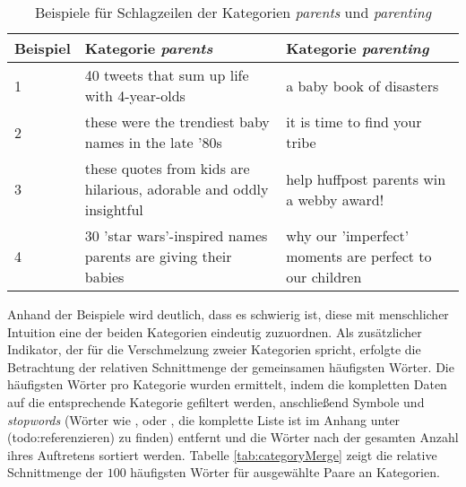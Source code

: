 \documentclass[a4paper,11pt]{article}
\begin{document}
\begin{table}[ht]
\begin{center}
\begin{tabular}{ | p{} | p{}| p{} | }
  \hline
Beispiel & Kategorie \textit{parents}  & Kategorie \textit{parenting} \\ 
  \hline
1 & 40 tweets that sum up life with 4-year-olds & a baby book of disasters \\ 
  2 & these were the trendiest baby names in the late '80s & it is time to find your tribe \\ 
  3 & these quotes from kids are hilarious, adorable and oddly insightful & help huffpost parents win a webby award! \\ 
  4 & 30  'star wars'-inspired names parents are giving their babies & why our 'imperfect' moments are perfect to our children \\ 
   \hline
\end{tabular}
\caption{Beispiele für Schlagzeilen der Kategorien \textit{parents} und \textit{parenting}}
\label{tab:parentsMerge}
\end{center}
\end{table}

Anhand der Beispiele wird deutlich, dass es schwierig ist, diese mit menschlicher Intuition eine der beiden Kategorien eindeutig zuzuordnen. Als zusätzlicher Indikator, der für die Verschmelzung zweier Kategorien spricht, erfolgte die Betrachtung der relativen Schnittmenge der gemeinsamen häufigsten Wörter. Die häufigsten Wörter pro Kategorie wurden ermittelt, indem die kompletten Daten auf die entsprechende Kategorie gefiltert werden, anschließend Symbole und \textit{stopwords} (Wörter wie ,  oder , die komplette Liste ist im Anhang unter (todo:referenzieren) zu finden) entfernt und die Wörter nach der gesamten Anzahl ihres Auftretens sortiert werden. Tabelle \ref{tab:categoryMerge} zeigt die relative Schnittmenge der $100$ häufigsten Wörter für ausgewählte Paare an Kategorien.
\end{document}
